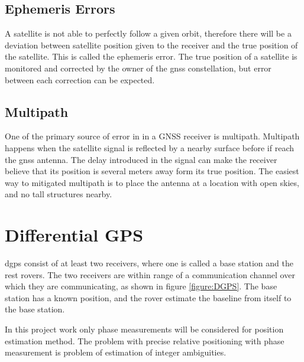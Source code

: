 \subsection{Ephemeris Errors}
A satellite is not able to perfectly follow a given orbit, therefore there will be a deviation between satellite position given to the receiver and the true position of the satellite. This is called the ephemeris error. The true position of a satellite is monitored and corrected by the owner of the \gls{gnss} constellation, but error between each correction can be expected.
\subsection{Multipath}
One of the primary source of error in in a GNSS receiver is multipath. Multipath happens when the satellite signal is reflected by a nearby surface before if reach the \gls{gnss} antenna. The delay introduced in the signal can make the receiver believe that its position is several meters away form its true position. The easiest way to mitigated multipath is to place the antenna at a location with open skies, and no tall structures nearby.
\section{Differential GPS}
\acrfull{dgps} consist of at least two receivers, where one is called a base station and the rest rovers. The two receivers are within range of a communication channel over which they are communicating, as shown in figure \ref{figure:DGPS}. The base station has a known position, and the rover estimate the baseline from itself to the base station.

In this project work only phase measurements will be considered for position estimation method.
The problem with precise relative positioning with phase measurement is problem of estimation of integer ambiguities.

